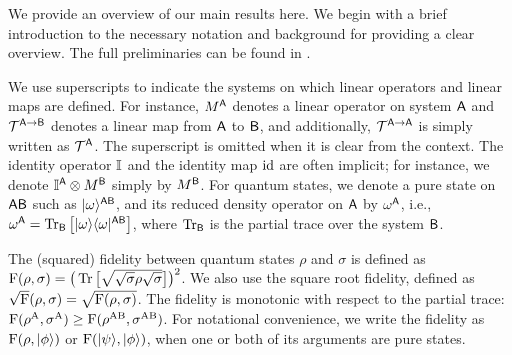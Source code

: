 



We provide an overview of our main results here.
We begin with a brief introduction to the necessary notation and background for providing a clear overview.
The full preliminaries can be found in .



We use superscripts to indicate the systems on which linear operators and linear maps are defined.
For instance, $M^{{\mathsf{A}}}$ denotes a linear operator on system ${\mathsf{A}}$ and ${\mathcal{T}}^{{\mathsf{A}} \rightarrow {\mathsf{B}}}$ denotes a linear map from ${\mathsf{A}}$ to ${\mathsf{B}}$, and additionally, ${\mathcal{T}}^{{\mathsf{A}} \rightarrow {\mathsf{A}}}$ is simply written as ${\mathcal{T}}^{{\mathsf{A}}}$.
The superscript is omitted when it is clear from the context.
The identity operator $\mathbb{I}$ and the identity map ${\mathrm{id}}$ are often implicit; for instance, we denote $\mathbb{I}^{\mathsf{A}} \otimes M^{\mathsf{B}}$ simply by $M^{{\mathsf{B}}}$.
For quantum states, we denote a pure state on ${\mathsf{A}}{\mathsf{B}}$ such as $|\omega\rangle^{{\mathsf{A}}{\mathsf{B}}}$, and its reduced density operator on ${\mathsf{A}}$ by $\omega^{\mathsf{A}}$, i.e., $\omega^{\mathsf{A}} = \operatorname{Tr}_{\mathsf{B}}\big[|\omega\rangle\langle\omega|^{{\mathsf{A}}{\mathsf{B}}}\big]$, where $\operatorname{Tr}_{\mathsf{B}}$ is the partial trace over the system ${\mathsf{B}}$.

The (squared) fidelity between quantum states $\rho$ and $\sigma$ is defined as ${\mathrm{F}}(\rho, \sigma) = \big(\operatorname{Tr}\big[\sqrt{\sqrt{\sigma}\rho\sqrt{\sigma}}\big]\big)^2$.
We also use the square root fidelity, defined as $\sqrt{{\mathrm{F}}}(\rho, \sigma) = \sqrt{{\mathrm{F}}(\rho, \sigma)}$.
The fidelity is monotonic with respect to the partial trace: ${\mathrm{F}}(\rho^{\mathrm{A}}, \sigma^{\mathrm{A}}) \geq {\mathrm{F}}(\rho^{{\mathrm{A}}{\mathrm{B}}}, \sigma^{{\mathrm{A}}{\mathrm{B}}})$.
For notational convenience, we write the fidelity as ${\mathrm{F}}(\rho, |\phi\rangle)$ or ${\mathrm{F}}(|\psi\rangle, |\phi\rangle)$, when one or both of its arguments are pure states.





